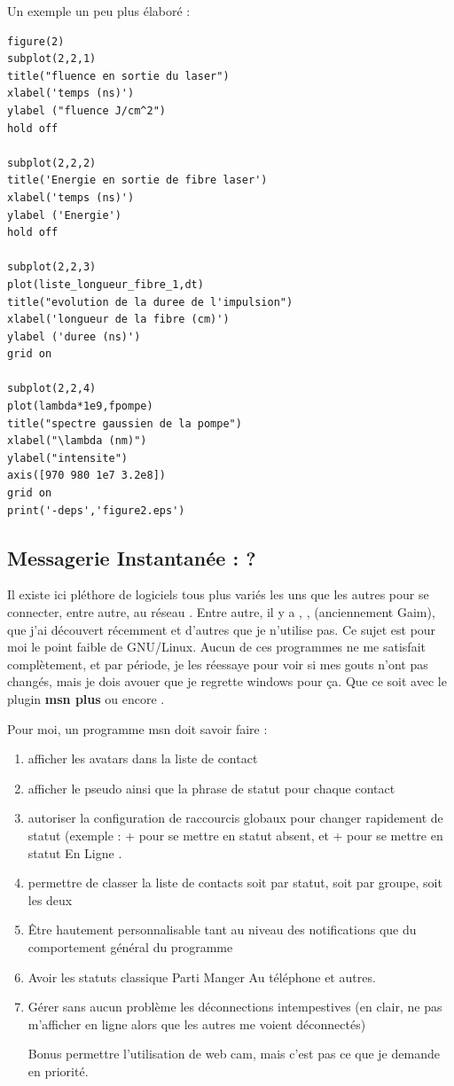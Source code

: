 \documentclass[a4paper,twoside]{article}
\begin{document}
Un exemple un peu plus élaboré :
\begin{verbatim}
figure(2)
subplot(2,2,1)
title("fluence en sortie du laser")
xlabel('temps (ns)')
ylabel ("fluence J/cm^2")
hold off

subplot(2,2,2)
title('Energie en sortie de fibre laser')
xlabel('temps (ns)')
ylabel ('Energie')
hold off

subplot(2,2,3)
plot(liste_longueur_fibre_1,dt)
title("evolution de la duree de l'impulsion")
xlabel('longueur de la fibre (cm)')
ylabel ('duree (ns)')
grid on

subplot(2,2,4)
plot(lambda*1e9,fpompe)
title("spectre gaussien de la pompe")
xlabel("\lambda (nm)")
ylabel("intensite")
axis([970 980 1e7 3.2e8])
grid on
print('-deps','figure2.eps')
\end{verbatim}



\subsection{Messagerie Instantanée : ?}
Il existe ici pléthore de logiciels tous plus variés les uns que les autres pour se connecter, entre autre, au réseau . Entre autre, il y a , ,  (anciennement Gaim),  que j'ai découvert récemment et d'autres que je n'utilise pas. Ce sujet est pour moi le point faible de GNU/Linux. Aucun de ces programmes ne me satisfait complètement, et par période, je les réessaye pour voir si mes gouts n'ont pas changés, mais je dois avouer que je regrette windows pour ça. Que ce soit  avec le plugin \textbf{msn plus} ou encore .

Pour moi, un programme msn doit savoir faire :
\begin{enumerate}
 \item afficher les avatars dans la liste de contact
\item afficher le pseudo ainsi que la phrase de statut pour chaque contact
\item autoriser la configuration de raccourcis globaux pour changer rapidement de statut (exemple : + pour se mettre en statut absent, et + pour se mettre en statut \og En Ligne \fg.
\item permettre de classer la liste de contacts soit par statut, soit par groupe, soit les deux
\item \^Etre hautement personnalisable tant au niveau des notifications que du comportement général du programme
\item Avoir les statuts classique \og Parti Manger \fg   \og Au téléphone \fg  et autres.
\item Gérer sans aucun problème les déconnections intempestives (en clair, ne pas m'afficher en ligne alors que les autres me voient déconnectés)
\item[Bonus] permettre l'utilisation de web cam, mais c'est pas ce que je demande en priorité.
\end{enumerate}
\end{document}
